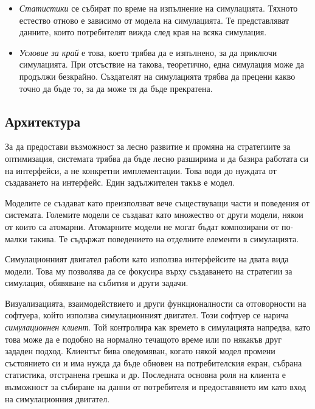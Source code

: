 \begin{itemize}
				\item \emph{Статистики} се събират по време на изпълнение на симулацията. Тяхното естество отново е зависимо от модела
				на симулацията. Те представляват данните, които потребителят вижда след края на всяка симулация.				
				
				\item \emph{Условие за край} е това, което трябва да е изпълнено, за да приключи симулацията. 
				При отсъствие на такова, теоретично, една симулация може да продължи безкрайно.
				Създателят на симулацията трябва да прецени какво точно да бъде то, 
				за да може тя да бъде прекратена.
				
			\end{itemize}
			
	\subsection{Архитектура}
		\label{sec:architecture}
		
		За да предостави възможност за лесно развитие и промяна на стратегиите за оптимизация, системата
		трябва да бъде лесно разширима и да базира работата си на интерфейси, а не конкретни имплементации.
		Това води до нуждата от създаването на интерфейс. Един задължителен такъв е модел. 
		
		Моделите се създават като преизползват вече съществуващи части и поведения от системата. 
		Големите модели се създават като множество от други модели, някои от които са атомарни.
		Атомарните модели не могат бъдат композирани от по-малки такива. Те съдържат поведението
		на отделните елементи в симулацията.
		
		Симулационният двигател работи като използва интерфейсите на двата вида модели. Това му позволява
		да се фокусира върху създаването на стратегии за симулация, обявяване на събития и други задачи.
		
		Визуализацията, взаимодействието и други функционалности са отговорности на софтуера, който използва 
		симулационният двигател. Този софтуер се нарича \emph{симулационнен клиент}. Той контролира
		как времето в симулацията напредва, като това може да е подобно на нормално течащото време или
		по някакъв друг зададен подход. Клиентът бива оведомяван, когато някой модел промени състоянието си
		и има нужда да бъде обновен на потребителския екран, събрана статистика, отстранена грешка и др.
		Последната основна роля на клиента е възможност за събиране на данни от потребителя и предоставянето
		им като вход на симулационния двигател.
		
